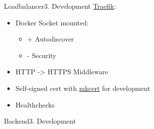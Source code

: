 \documentclass[aspectratio=169,20pt]{beamer}
\begin{document}
\begin{frame}{Loadbalancer}{3. Development}
	\underline{Traefik}:
	\begin{itemize}
		\item{Docker Socket mounted:}
		\begin{itemize}
			\item{+ Autodiscover}
			\item{- Security}
		\end{itemize}
		\item{HTTP -> HTTPS Middleware}
		\item{Self-signed cert with \href{https://github.com/FiloSottile/mkcert}{mkcert} for development}
		\item{Healthchecks}
	\end{itemize}
\end{frame}

\begin{frame}{Backend}{3. Development}
\end{frame}
\end{document}
